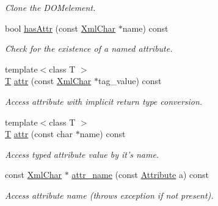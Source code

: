 \begin{DoxyCompactItemize}
\begin{DoxyCompactList}\small\item\em Clone the DOMelement. \item\end{DoxyCompactList}\item 
bool \hyperlink{class_d_d4hep_1_1_x_m_l_1_1_element_a6219f70c6e6cb89ea70f335afeca0957}{hasAttr} (const \hyperlink{namespace_d_d4hep_1_1_x_m_l_a09e5d9cc86ed782f6826dfe0778c1815}{XmlChar} $\ast$name) const 
\begin{DoxyCompactList}\small\item\em Check for the existence of a named attribute. \item\end{DoxyCompactList}\item 
{\footnotesize template$<$class T $>$ }\\\hyperlink{class_t}{T} \hyperlink{class_d_d4hep_1_1_x_m_l_1_1_element_ab540a1af6399fe6a5b6ffe507dc3d4b5}{attr} (const \hyperlink{namespace_d_d4hep_1_1_x_m_l_a09e5d9cc86ed782f6826dfe0778c1815}{XmlChar} $\ast$tag\_\-value) const 
\begin{DoxyCompactList}\small\item\em Access attribute with implicit return type conversion. \item\end{DoxyCompactList}\item 
{\footnotesize template$<$class T $>$ }\\\hyperlink{class_t}{T} \hyperlink{class_d_d4hep_1_1_x_m_l_1_1_element_a11a9445e2fc00281b5b008774ae60e91}{attr} (const char $\ast$name) const 
\begin{DoxyCompactList}\small\item\em Access typed attribute value by it's name. \item\end{DoxyCompactList}\item 
const \hyperlink{namespace_d_d4hep_1_1_x_m_l_a09e5d9cc86ed782f6826dfe0778c1815}{XmlChar} $\ast$ \hyperlink{class_d_d4hep_1_1_x_m_l_1_1_element_a40e999c89474ff42500772098242643e}{attr\_\-name} (const \hyperlink{namespace_d_d4hep_1_1_x_m_l_a5c19b7116be99d69b4b22d911357baaf}{Attribute} a) const 
\begin{DoxyCompactList}\small\item\em Access attribute name (throws exception if not present). \item\end{DoxyCompactList}\item 

\end{DoxyCompactItemize}
